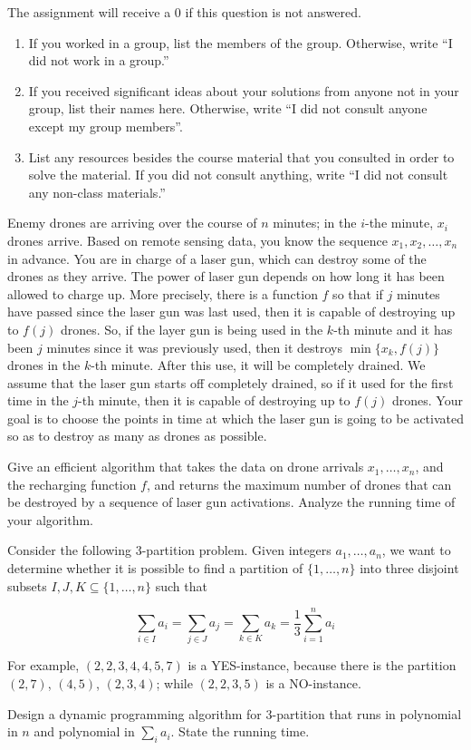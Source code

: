 \documentclass[11pt]{article}
\begin{document}
\begin{qunlist}
\setcounter{sparectr}{-1}

	The assignment will receive a 0 if this question is not answered.
\begin{enumerate}
	\item If you worked in a group, list the members of the group. Otherwise, write ``I did not work in a group.''
	\item If you received significant ideas about your solutions from anyone not in your group, list their names here. Otherwise, write ``I did not consult  anyone except my group members''.
	\item List any resources besides the course material that you consulted in order to solve the material. If you did not consult anything, write ``I did not consult any non-class materials.''
\end{enumerate}


Enemy drones are arriving over the course of $n$ minutes; in the $i$-the minute, $x_i$ drones arrive. Based on remote sensing data, you know the sequence $x_1, x_2, \ldots, x_n$ in advance. You are in charge of a laser gun, which can destroy some of the drones as they arrive. The power of laser gun depends on how long it has been allowed to charge up. More precisely, there is a function $f$ so that if $j$ minutes have passed since the laser gun was last used, then it is capable of destroying up to $f(j)$ drones. So, if the layer gun is being used in the $k$-th minute and it has been $j$ minutes since it was previously used, then it destroys $\min\{x_k, f(j)\}$ drones in the $k$-th minute. After this use, it will be completely drained. We assume that the laser gun starts off completely drained, so if it used for the first time in the $j$-th minute, then it is capable of destroying up to $f(j)$ drones. Your goal is to choose the points in time at which the laser gun is going to be activated so as to destroy as many as drones as possible.

Give an efficient algorithm that takes the data on drone arrivals $x_1, \ldots, x_n$, and the recharging function $f$, and returns the maximum number of drones that can be destroyed by a sequence of laser gun activations. Analyze the running time of your algorithm.


Consider the following 3-partition problem. Given integers $a_1,\ldots,a_n$, we want to determine whether it is possible to find a partition of $\{1,\ldots,n\}$ into three disjoint subsets $I,J,K \subseteq \{1,\ldots,n\}$
such that 

\[ 
  \sum_{i\in I} a_i = \sum_{j\in J} a_j= \sum_{k\in K} a_k = \frac 13
\sum_{i=1}^n a_i 
\]

For example, $(2,2,3,4,4,5,7)$ is a YES-instance, because there is the partition $(2,7)$, $(4,5)$, $(2,3,4)$; while $(2,2,3,5)$ is a NO-instance.

Design a dynamic programming algorithm for 3-partition that runs in polynomial in $n$ and polynomial in $\sum_i a_i$. State the running time.


\end{qunlist}
\end{document}
